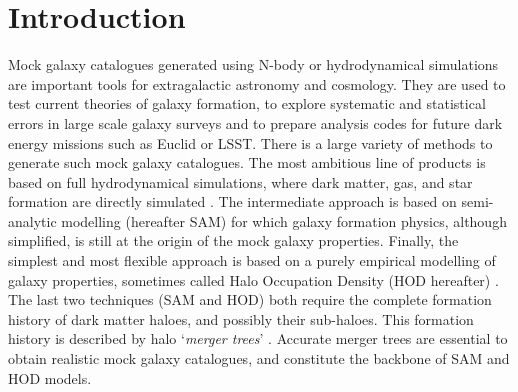 \chapter{Introduction}

Mock galaxy catalogues generated using N-body or hydrodynamical
simulations are important tools for extragalactic astronomy and
cosmology.  They are used to test current theories of galaxy
formation, to explore systematic and statistical errors in large scale
galaxy surveys and to prepare analysis codes for future dark energy
missions such as Euclid or LSST.  There is a large variety of methods
to generate such mock galaxy catalogues.  The most ambitious line of
products is based on full hydrodynamical simulations, where dark
matter, gas, and star formation are directly simulated
\citep[e.g.][]{duboisDancingDarkGalactic2014,
  khandaiMassiveBlackIISimulationEvolution2015,
  vogelsbergerPropertiesGalaxiesReproduced2014,
  schayeEAGLEProjectSimulating2015}.
The intermediate approach is based on semi-analytic modelling
(hereafter SAM) \citep[e.g.][]{whiteGalaxyFormationHierarchical1991,
  bowerBreakingHierarchyGalaxy2006, somervilleSemianalyticModellingGalaxy1999,
    kauffmannFormationEvolutionGalaxies1993,
  kangSemianalyticalModelGalaxy2005,crotonManyLivesActive2006} for
which galaxy formation physics, although simplified, is still at the
origin of the mock galaxy properties. Finally, the simplest and most
flexible approach is based on a purely empirical modelling of galaxy
properties, sometimes called Halo Occupation Density (HOD hereafter)
\citep[e.g.][]{seljakAnalyticModelGalaxy2000, berlindHaloOccupationDistribution2002,
  peacockHaloOccupationNumbers2000,
  bensonNatureGalaxyBias2000,wechslerGalaxyFormationConstraints2001,
  scoccimarroHowManyGalaxies2001}.
The last two techniques (SAM and HOD) both require the complete
formation history of dark matter
haloes, and possibly their sub-haloes. This formation history is
described by halo `\emph{merger trees}'
\citep{roukemaSpectralEvolutionMerging1993,
  roukemaFailureSimpleMerging1993, laceyMergerRatesHierarchical1993}.
Accurate merger trees are essential to obtain realistic mock galaxy
catalogues, and constitute the backbone of SAM and HOD models.


